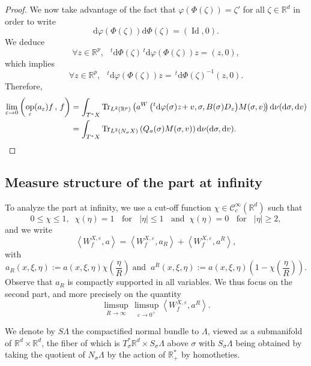 \documentclass[AHL,Unicode,longabstracts]{cedram}
\DeclareMathOperator{\Id}{Id}
\DeclareMathOperator{\Trr}{Tr}
\DeclareMathOperator{\op}{op}
\newcommand*\R{{\mathbb R}}
\newcommand*\eps{\varepsilon}
\numberwithin{equation}{section}
\let\oldforall\forall
\renewcommand*{\forall}{\mathrel{\oldforall}}
\newcommand*{\dd}{\mathrm{d}}
\newcommand*{\dv}{\dd v}
\newcommand*{\dnu}{\dd \nu}
\newcommand*{\dsigma}{\dd \sigma}
\newcommand*{\dphi}{\dd \varphi}
\newcommand*{\dPhi}{\dd \Phi} %
\begin{document}
\begin{proof}
We now take advantage of the fact that $\varphi(\Phi(\zeta))=\zeta'$ for all $\zeta\in\R^d$ in order to write
\[
\dphi(\Phi(\zeta))\dPhi (\zeta)=({\Id}, 0).
\]
We deduce
\[
\forall z\in \R^p,\;\; \,^t\dPhi (\zeta) \,^t\dphi(\Phi(\zeta)) z=(z,0),
\]
which implies
\[
\forall z\in \R^p,\;\; \,^t \dphi(\Phi(\zeta)) z= \,^t\dPhi (\zeta)^{-1} (z,0).
\]
Therefore,
\begin{align*}
\lim_{\eps\rightarrow 0} \left(\op_\eps(a_\eps)f\,,\,f\right)& = \int_{T^*X} {\Trr}_{L^2(\R^p)} \left(a^W\left(^t \dphi(\sigma)z\!+v, \sigma,B(\sigma)D_z\right)\! M(\sigma,v)\!\right)\dnu(\dsigma,\dv)\\
& = \int_{T^*X} {\Trr}_{L^2(N_\sigma X)} \left(Q_a(\sigma)M(\sigma,v)\right)\dnu(\dsigma,\dv).\qedhere
\end{align*}
\end{proof}



\subsection{Measure structure of the part at infinity}



To analyze the part at infinity, we use a cut-off function $\chi\in{\mathcal C} _c^\infty (\R^d)$ such that
\[
0\leq \chi\leq 1, \;\;\chi(\eta)=1\;\;\text{ for }\;\; |\eta|\leq 1\;\;\text{ and}\;\; \chi(\eta)=0 \;\;\text{ for }\;\;|\eta|\geq 2,
\]
and we write
\[
\left\langle W^{X,\eps}_{f},a\right\rangle=\left\langle W^{X,\eps}_{f},a_{R}\right\rangle+\left\langle W^{X,\eps}_{f},a^{ R}\right\rangle,
\]
with
\begin{equation}\label{def:aR}
a_{R}(x,\xi,\eta):=a(x,\xi,\eta) \chi\left(\frac{\eta}{R}\right)\;\text{and}\;\;a^{R}(x,\xi,\eta):=a(x,\xi,\eta) \left(1-\chi\left(\frac{\eta}{R}\right)\right).
\end{equation}
Observe that $a_R$ is compactly supported in all variables. We thus focus on the second part, and more precisely on the quantity
\[
\limsup_{R\to\infty}\, \limsup_{\eps\to 0^+}\left\langle W^{X,\eps}_{f},a^R\right\rangle.
\]


We denote by $S\Lambda$ the compactified normal bundle to $\Lambda$, viewed as a submanifold of $\R^d\times \R^d$, the fiber of which is $T^*_\sigma\R^d\times S_\sigma\Lambda$ above $\sigma$ with $S_\sigma\Lambda$ being obtained by taking the quotient of $N_\sigma\Lambda$ by the action of $\R^*_+$ by homotheties.
\end{document}
